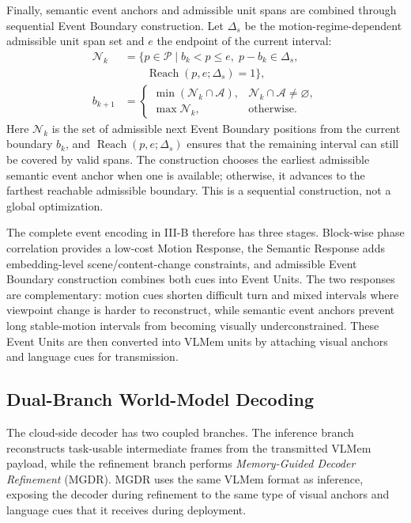 Finally, semantic event anchors and admissible unit spans are combined through sequential Event Boundary construction. Let \(\Delta_s\) be the motion-regime-dependent admissible unit span set and \(e\) the endpoint of the current interval:
\begin{equation}
\begin{aligned}
\mathcal{N}_k
&=\{p\in\mathcal{P}\mid b_k<p\le e,\;
p-b_k\in\Delta_s,\\
&\qquad\operatorname{Reach}(p,e;\Delta_s)=1\},\\
b_{k+1}
&=
\begin{cases}
\min(\mathcal{N}_k\cap\mathcal{A}),
& \mathcal{N}_k\cap\mathcal{A}\neq\varnothing,\\
\max\mathcal{N}_k, & \mathrm{otherwise}.
\end{cases}
\end{aligned}
\label{eq:admissible_boundary_construction}
\end{equation}
Here \(\mathcal{N}_k\) is the set of admissible next Event Boundary positions from the current boundary \(b_k\), and \(\operatorname{Reach}(p,e;\Delta_s)\) ensures that the remaining interval can still be covered by valid spans. The construction chooses the earliest admissible semantic event anchor when one is available; otherwise, it advances to the farthest reachable admissible boundary. This is a sequential construction, not a global optimization.

The complete event encoding in III-B therefore has three stages. Block-wise phase correlation provides a low-cost Motion Response, the Semantic Response adds embedding-level scene/content-change constraints, and admissible Event Boundary construction combines both cues into Event Units. The two responses are complementary: motion cues shorten difficult turn and mixed intervals where viewpoint change is harder to reconstruct, while semantic event anchors prevent long stable-motion intervals from becoming visually underconstrained. These Event Units are then converted into VLMem units by attaching visual anchors and language cues for transmission.

\subsection{Dual-Branch World-Model Decoding}
\label{subsec:wm_lora_decoding}

The cloud-side decoder has two coupled branches. The inference branch reconstructs task-usable intermediate frames from the transmitted VLMem payload, while the refinement branch performs \emph{Memory-Guided Decoder Refinement} (MGDR). MGDR uses the same VLMem format as inference, exposing the decoder during refinement to the same type of visual anchors and language cues that it receives during deployment.

